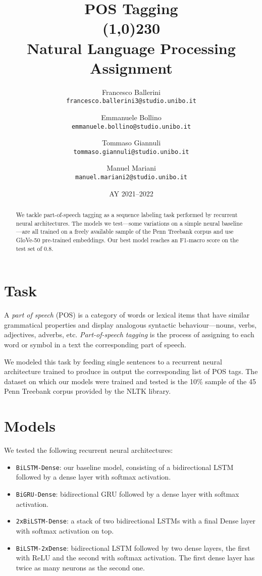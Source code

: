 \documentclass[10pt]{article}
\title{
POS Tagging\\
\vspace{-10pt}
\line(1,0){230}\\
\large{Natural Language Processing Assignment}
}
\author{
Francesco Ballerini\\
\small{\texttt{francesco.ballerini3@studio.unibo.it}}
\and
Emmanuele Bollino\\
\small{\texttt{emmanuele.bollino@studio.unibo.it}}
\and
Tommaso Giannuli\\
\small{\texttt{tommaso.giannuli@studio.unibo.it}}
\and
Manuel Mariani\\
\small{\texttt{manuel.mariani2@studio.unibo.it}}
}
\date{AY 2021--2022}
\newcommand{\bilstm}{\texttt{BiLSTM-Dense}}
\newcommand{\bigru}{\texttt{BiGRU-Dense}}
\newcommand{\doublebilstm}{\texttt{2xBiLSTM-Dense}}
\newcommand{\doubledense}{\texttt{BiLSTM-2xDense}}
\begin{document}
\maketitle
\thispagestyle{empty}

\begin{abstract}
We tackle part-of-speech tagging as a sequence labeling task performed by recurrent neural architectures. The models we test---some variations on a simple neural baseline---are all trained on a freely available sample of the Penn Treebank corpus and use GloVe-50 pre-trained embeddings. Our best model reaches an F1-macro score on the test set of 0.8.
    
\end{abstract}

\section{Task}
A \emph{part of speech} (POS) is a category of words or lexical items that have similar grammatical properties and display analogous syntactic behaviour---nouns, verbs, adjectives, adverbs, etc. \emph{Part-of-speech tagging} is the process of assigning to each word or symbol in a text the corresponding part of speech.

We modeled this task by feeding single sentences to a recurrent neural architecture trained to produce in output the corresponding list of POS tags. The dataset on which our models were trained and tested is the 10\% sample of the 45 Penn Treebank corpus provided by the NLTK library.


\section{Models}
We tested the following recurrent neural architectures:
\begin{itemize}
    \item \bilstm: our baseline model, consisting of a bidirectional LSTM followed by a dense layer with softmax activation.
    \item \bigru: bidirectional GRU followed by a dense layer with softmax activation.
    \item \doublebilstm: a stack of two bidirectional LSTMs with a final Dense layer with softmax activation on top.
    \item \doubledense: bidirectional LSTM followed by two dense layers, the first with ReLU and the second with softmax activation. The first dense layer has twice as many neurons as the second one.
\end{itemize}
\end{document}
